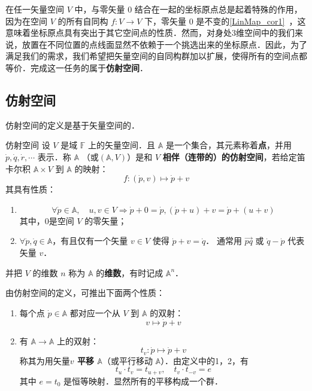 

在任一矢量空间 $V$ 中，与零矢量 $0$ 结合在一起的坐标原点总是起着特殊的作用，因为在空间 $V$ 的所有自同构 $f:V\rightarrow V$ 下，零矢量 $0$ 是不变的\autoref{LinMap_cor1}~，这意味着坐标原点具有突出于其它空间点的性质．然而，对身处3维空间中的我们来说，放置在不同位置的点线面显然不依赖于一个挑选出来的坐标原点．因此，为了满足我们的需求，我们希望把矢量空间的自同构群加以扩展，使得所有的空间点都等价．完成这一任务的属于\textbf{仿射空间}．
\subsection{仿射空间}
仿射空间的定义是基于矢量空间的．
\begin{definition}{仿射空间}\label{AfSp_def1}
设 $V$ 是域 $\mathbb F$ 上的矢量空间．且 $\mathbb A$ 是一个集合，其元素称着\textbf{点}，并用 $\dot{p},\dot{q},\dot{r},\cdots$ 表示．称 $\mathbb A$ （或$(\mathbb A,V)$）是和 $V$ \textbf{相伴（连带的）的仿射空间}，若给定笛卡尔积 $\mathbb A\times V$ 到 $\mathbb A$ 的映射：
\begin{equation}
f:(\dot p,v)\mapsto\dot p+v
\end{equation}
其具有性质：
\begin{enumerate}
\item \begin{equation}
\forall \dot p\in\mathbb A,\quad u,v\in V\Rightarrow\dot p+0=\dot p,(\dot p+u)+v=\dot p+(u+v)
\end{equation}
其中，0是空间 $V$ 的零矢量；
\item $\forall \dot p,\dot q\in\mathbb A$，有且仅有一个矢量 $v\in V$ 使得 $\dot p+v=\dot q$． 通常用 $\vec{pq}$ 或 $\dot q-\dot p$ 代表矢量 $v$．
\end{enumerate}
并把 $V$ 的维数 $n$ 称为 $\mathbb A$ 的\textbf{维数}，有时记成 $\mathbb A^n$．
\end{definition}
由仿射空间的定义，可推出下面两个性质：
\begin{enumerate}
\item 每个点 $\dot p\in \mathbb A$ 都对应一个从 $V$ 到 $\mathbb A$ 的双射：
\begin{equation}
v\mapsto \dot p+v
\end{equation}

\item 有 $\mathbb A\rightarrow\mathbb A$ 上的双射：
\begin{equation}
t_v:\dot p\mapsto\dot p+v
\end{equation}
 称其为用矢量\textbf{$v$ 平移 $\mathbb A$}（或平行移动 $\mathbb A$）．由定义中的1，2，有
 \begin{equation}
 t_u\cdot t_v=t_{u+v},\quad t_v\cdot t_{-v}=e
 \end{equation}
  其中 $e=t_0$ 是恒等映射．显然所有的平移构成一个群．
\end{enumerate}
